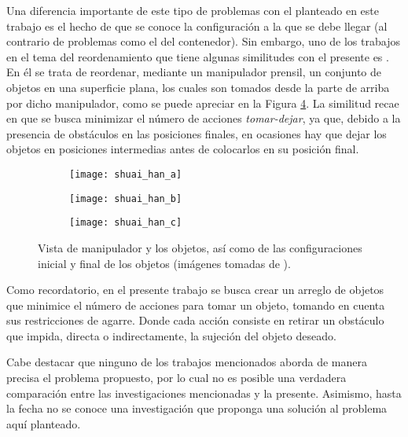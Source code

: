 Una diferencia importante de este tipo de problemas con el planteado en este trabajo es el hecho de que se conoce la configuración a la que se debe llegar (al contrario de problemas como el del contenedor).
Sin embargo, uno de los trabajos en el tema del reordenamiento que tiene algunas similitudes con el presente es \cite{Han-RSS-17}.
En él se trata de reordenar, mediante un manipulador prensil, un conjunto de objetos en una superficie plana, los cuales son tomados desde la parte de arriba por dicho manipulador, como se puede apreciar en la Figura \ref{fig:Han-RSS-17}.
La similitud recae en que se busca minimizar el número de acciones \textsl{tomar-dejar}, ya que, debido a la presencia de obstáculos en las posiciones finales, en ocasiones hay que dejar los objetos en posiciones intermedias antes de colocarlos en su posición final.
%
\begin{figure}[H]
	\begin{subfigure}{0.1978\linewidth}
		\texttt{[image: shuai\_han\_a]}%
		\subcaption{}%
		\label{subfig:manipulator_objects}%
	\end{subfigure}%
	\hfill%
	\begin{subfigure}{0.3783\linewidth}
		\texttt{[image: shuai\_han\_b]}%
		\subcaption{}%
		\label{subfig:initial_arrangement}%
	\end{subfigure}%
	\hfill%
	\begin{subfigure}{0.3941\linewidth}
		\texttt{[image: shuai\_han\_c]}%
		\subcaption{}%
		\label{subfig:final_arrangement}%
	\end{subfigure}%
	\caption{Vista de  manipulador y los objetos, así como de las configuraciones  inicial y  final de los objetos (imágenes tomadas de \cite{Han-RSS-17}).}%
	\label{fig:Han-RSS-17}%
\end{figure}
%
Como recordatorio, en el presente trabajo se busca crear un arreglo de objetos que minimice el número de acciones para tomar un objeto, tomando en cuenta sus restricciones de agarre.
Donde cada acción consiste en retirar un obstáculo que impida, directa o indirectamente, la sujeción del objeto deseado.

Cabe destacar que ninguno de los trabajos mencionados aborda de manera precisa el problema propuesto, por lo cual no es posible una verdadera comparación entre las investigaciones mencionadas y la presente.
Asimismo, hasta la fecha no se conoce una investigación que proponga una solución al problema aquí planteado.
